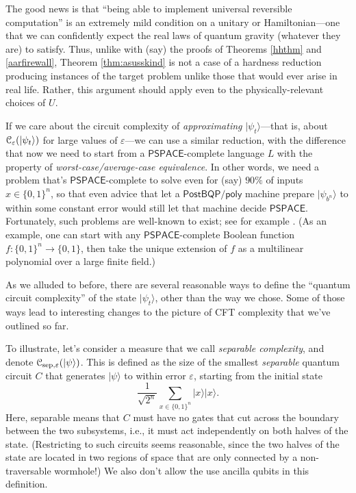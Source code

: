\documentclass[12pt]{report}
\theoremstyle{plain}
\theoremstyle{definition}
\newcommand{\eps}{\varepsilon}
\renewcommand{\ket}[1]{|#1\rangle}
\begin{document}
The good news is that ``being able to implement universal reversible computation'' is an extremely mild condition on a unitary or Hamiltonian---one that we can confidently expect the real laws of quantum gravity (whatever they are) to satisfy.  Thus, unlike with (say) the proofs of Theorems \ref{hhthm} and \ref{aarfirewall}, Theorem \ref{thm:asusskind} is not a case of a hardness reduction producing instances of the target problem unlike those that would ever arise in real life.  Rather, this argument should apply even to the physically-relevant choices of $U$.

If we care about the circuit complexity of {\em approximating} $\ket{\psi_t}$---that is, about ${\cal C}_\eps(\ket{\psi_t})$ for large values of $\eps$---we can use a similar reduction, with the difference that now we need to start from a $\mathsf{PSPACE}$-complete language $L$ with the property of {\em worst-case/average-case equivalence}.  In other words, we need a problem that's $\mathsf{PSPACE}$-complete to solve even for (say) $90\%$ of inputs $x\in \{0,1\}^n$, so that even advice that let a $\mathsf{PostBQP/poly}$ machine prepare $\ket{\psi_{b^n}}$ to within some constant error would still let that machine decide $\mathsf{PSPACE}$.  Fortunately, such problems are well-known to exist; see for example \cite{AFK89}.  (As an example, one can start with any $\mathsf{PSPACE}$-complete Boolean function $f:\{0,1\}^n \longrightarrow \{0,1\}$, then take the unique extension of $f$ as a multilinear polynomial over a large finite field.)

As we alluded to before, there are several reasonable ways to define the ``quantum circuit complexity'' of the state $\ket{\psi_t}$, other than the way we chose.  Some of those ways lead to interesting changes to the picture of CFT complexity that we've outlined so far.

To illustrate, let's consider a measure that we call {\em separable complexity}, and
denote ${\cal C}_{\mathrm{sep},\eps}(\ket{\psi})$.  This is defined as the size of the smallest \emph{separable} quantum circuit $C$ that generates $\ket{\psi}$ to within error $\eps$, starting from the initial state
$$ \frac{1}{\sqrt{2^n}} \sum_{x\in \{0,1\}^n} \ket{x}\ket{x}. $$
Here, separable means that $C$ must have no gates that cut across the boundary between the two subsystems, i.e., it must act independently on both halves of the state.  (Restricting to such circuits seems reasonable, since the two halves of the state are located in two regions of space that are only connected by a non-traversable wormhole!)  We also don't allow the use ancilla qubits in this definition.
\end{document}

